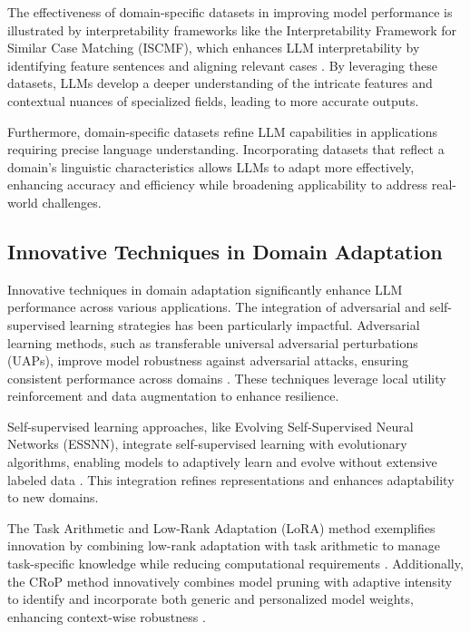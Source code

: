 The effectiveness of domain-specific datasets in improving model performance is illustrated by interpretability frameworks like the Interpretability Framework for Similar Case Matching (ISCMF), which enhances LLM interpretability by identifying feature sentences and aligning relevant cases \cite{lin2023interpretabilityframeworksimilarcase}. By leveraging these datasets, LLMs develop a deeper understanding of the intricate features and contextual nuances of specialized fields, leading to more accurate outputs.

Furthermore, domain-specific datasets refine LLM capabilities in applications requiring precise language understanding. Incorporating datasets that reflect a domain's linguistic characteristics allows LLMs to adapt more effectively, enhancing accuracy and efficiency while broadening applicability to address real-world challenges.

\subsection{Innovative Techniques in Domain Adaptation} \label{subsec:Innovative Techniques in Domain Adaptation}

Innovative techniques in domain adaptation significantly enhance LLM performance across various applications. The integration of adversarial and self-supervised learning strategies has been particularly impactful. Adversarial learning methods, such as transferable universal adversarial perturbations (UAPs), improve model robustness against adversarial attacks, ensuring consistent performance across domains \cite{zhang2024universaladversarialperturbationsvisionlanguage}. These techniques leverage local utility reinforcement and data augmentation to enhance resilience.

Self-supervised learning approaches, like Evolving Self-Supervised Neural Networks (ESSNN), integrate self-supervised learning with evolutionary algorithms, enabling models to adaptively learn and evolve without extensive labeled data \cite{le2019evolvingselfsupervisedneuralnetworks}. This integration refines representations and enhances adaptability to new domains.

The Task Arithmetic and Low-Rank Adaptation (LoRA) method exemplifies innovation by combining low-rank adaptation with task arithmetic to manage task-specific knowledge while reducing computational requirements \cite{chitale2023taskarithmeticloracontinual}. Additionally, the CRoP method innovatively combines model pruning with adaptive intensity to identify and incorporate both generic and personalized model weights, enhancing context-wise robustness \cite{kaur2024cropcontextwiserobuststatic}.

